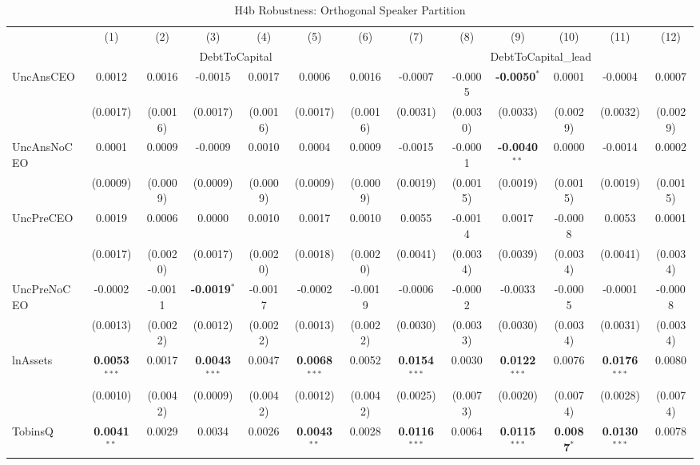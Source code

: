 \begin{landscape}
\begin{table}[H]
\setlength{\tabcolsep}{3pt}
\renewcommand{\arraystretch}{0.85}
\centering
\caption{H4b Robustness: Orthogonal Speaker Partition}
\label{tab:h4b_robust}
\scriptsize
\begin{tabular}{lcccccccccccc}
\toprule
 & (1) & (2) & (3) & (4) & (5) & (6) & (7) & (8) & (9) & (10) & (11) & (12) \\
 & \multicolumn{6}{c}{DebtToCapital} & \multicolumn{6}{c}{DebtToCapital\_lead} \\
\cmidrule(lr){2-7} \cmidrule(lr){8-13}
\midrule
UncAnsCEO & 0.0012 & 0.0016 & -0.0015 & 0.0017 & 0.0006 & 0.0016 & -0.0007 & -0.0005 & \textbf{-0.0050}$^{*}$ & 0.0001 & -0.0004 & 0.0007 \\
 & (0.0017) & (0.0016) & (0.0017) & (0.0016) & (0.0017) & (0.0016) & (0.0031) & (0.0030) & (0.0033) & (0.0029) & (0.0032) & (0.0029) \\
UncAnsNoCEO & 0.0001 & 0.0009 & -0.0009 & 0.0010 & 0.0004 & 0.0009 & -0.0015 & -0.0001 & \textbf{-0.0040}$^{**}$ & 0.0000 & -0.0014 & 0.0002 \\
 & (0.0009) & (0.0009) & (0.0009) & (0.0009) & (0.0009) & (0.0009) & (0.0019) & (0.0015) & (0.0019) & (0.0015) & (0.0019) & (0.0015) \\
UncPreCEO & 0.0019 & 0.0006 & 0.0000 & 0.0010 & 0.0017 & 0.0010 & 0.0055 & -0.0014 & 0.0017 & -0.0008 & 0.0053 & 0.0001 \\
 & (0.0017) & (0.0020) & (0.0017) & (0.0020) & (0.0018) & (0.0020) & (0.0041) & (0.0034) & (0.0039) & (0.0034) & (0.0041) & (0.0034) \\
UncPreNoCEO & -0.0002 & -0.0011 & \textbf{-0.0019}$^{*}$ & -0.0017 & -0.0002 & -0.0019 & -0.0006 & -0.0002 & -0.0033 & -0.0005 & -0.0001 & -0.0008 \\
 & (0.0013) & (0.0022) & (0.0012) & (0.0022) & (0.0013) & (0.0022) & (0.0030) & (0.0033) & (0.0030) & (0.0034) & (0.0031) & (0.0034) \\
\midrule
lnAssets & \textbf{0.0053}$^{***}$ & 0.0017 & \textbf{0.0043}$^{***}$ & 0.0047 & \textbf{0.0068}$^{***}$ & 0.0052 & \textbf{0.0154}$^{***}$ & 0.0030 & \textbf{0.0122}$^{***}$ & 0.0076 & \textbf{0.0176}$^{***}$ & 0.0080 \\
 & (0.0010) & (0.0042) & (0.0009) & (0.0042) & (0.0012) & (0.0042) & (0.0025) & (0.0073) & (0.0020) & (0.0074) & (0.0028) & (0.0074) \\
TobinsQ & \textbf{0.0041}$^{**}$ & 0.0029 & 0.0034 & 0.0026 & \textbf{0.0043}$^{**}$ & 0.0028 & \textbf{0.0116}$^{***}$ & 0.0064 & \textbf{0.0115}$^{***}$ & \textbf{0.0087}$^{*}$ & \textbf{0.0130}$^{***}$ & 0.0078 \\

\end{tabular}
\end{table}
\end{landscape}

